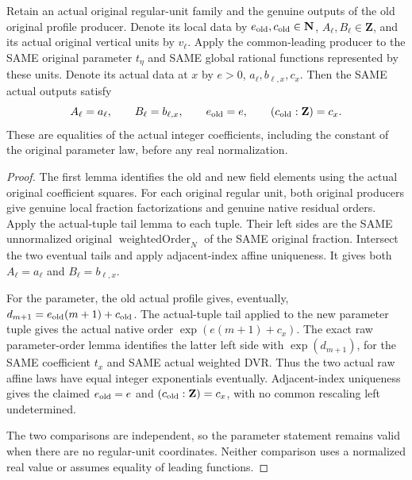 \begin{theorem}
\label{thm:gauss-common-leading-profile-coefficients}
\leanok
Retain an actual original regular-unit family and the genuine outputs of
the old original profile producer. Denote its local data by
$e_{\rm old},c_{\rm old}\in\mathbf N$, $A_\ell,B_\ell\in\mathbf Z$,
and its actual original vertical units by $v_\ell$.
Apply the common-leading producer to the SAME original parameter
$t_\eta$ and SAME global rational functions represented by these units.
Denote its actual data at $x$ by $e>0$, $a_\ell,b_{\ell,x},c_x$.
Then the SAME actual outputs satisfy
\[
 A_\ell=a_\ell,\qquad B_\ell=b_{\ell,x},\qquad
 e_{\rm old}=e,\qquad (c_{\rm old}:\mathbf Z)=c_x.
\]
These are equalities of the actual integer coefficients, including the
constant of the original parameter law, before any real normalization.
\end{theorem}
\begin{proof}
The first lemma identifies the old and new field elements using the
actual original coefficient squares. For each original regular unit,
both original producers give genuine local fraction factorizations and
genuine native residual orders. Apply the actual-tuple tail lemma to
each tuple. Their left sides are the SAME unnormalized original
$\operatorname{weightedOrder}_N$ of the SAME original fraction.
Intersect the two eventual tails and apply adjacent-index affine
uniqueness. It gives both $A_\ell=a_\ell$ and $B_\ell=b_{\ell,x}$.

For the parameter, the old actual profile gives, eventually,
$d_{m+1}=e_{\rm old}(m+1)+c_{\rm old}$.
The actual-tuple tail applied to the new parameter tuple gives the
actual native order $\exp(e(m+1)+c_x)$.
The exact raw parameter-order lemma identifies the latter left side
with $\exp(d_{m+1})$, for the SAME coefficient $t_x$ and SAME actual
weighted DVR. Thus the two actual raw affine laws have equal integer
exponentials eventually. Adjacent-index uniqueness gives the claimed
$e_{\rm old}=e$ and $(c_{\rm old}:\mathbf Z)=c_x$, with no common
rescaling left undetermined.

The two comparisons are independent, so the parameter statement remains
valid when there are no regular-unit coordinates. Neither comparison
uses a normalized real value or assumes equality of leading functions.
\end{proof}

